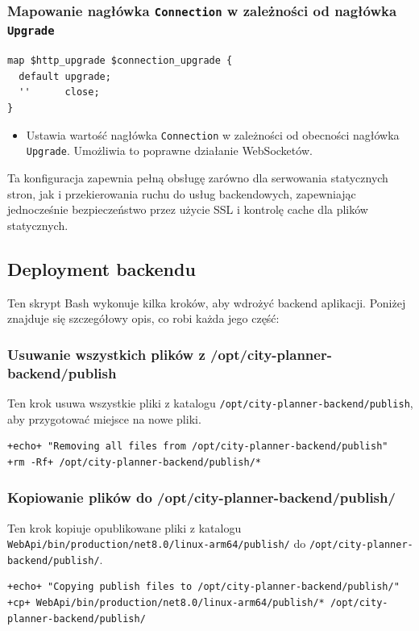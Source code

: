 \subsubsection{Mapowanie nagłówka \texttt{Connection} w zależności od nagłówka \texttt{Upgrade}}
\begin{lstlisting}[label={lst:n11}]
map $http_upgrade $connection_upgrade {
  default upgrade;
  ''      close;
}
\end{lstlisting}
\begin{itemize}
    \item Ustawia wartość nagłówka \texttt{Connection} w zależności od obecności nagłówka \texttt{Upgrade}.
    Umożliwia to poprawne działanie WebSocketów.
\end{itemize}

Ta konfiguracja zapewnia pełną obsługę zarówno dla serwowania statycznych stron, jak i przekierowania ruchu do usług backendowych, zapewniając jednocześnie bezpieczeństwo przez użycie SSL i kontrolę cache dla plików statycznych.

\subsection{Deployment backendu}
\label{subsec:deployment-backendu}
Ten skrypt Bash wykonuje kilka kroków, aby wdrożyć backend aplikacji.
Poniżej znajduje się szczegółowy opis, co robi każda jego część:

\subsubsection{Usuwanie wszystkich plików z /opt/city-planner-backend/publish}
Ten krok usuwa wszystkie pliki z katalogu \texttt{/opt/city-planner-backend/publish}, aby przygotować miejsce na nowe pliki.
\begin{lstlisting}[style=shell-colored,label={lst:db1}]
+echo+ "Removing all files from /opt/city-planner-backend/publish"
+rm -Rf+ /opt/city-planner-backend/publish/*
\end{lstlisting}

\subsubsection{Kopiowanie plików do /opt/city-planner-backend/publish/}
Ten krok kopiuje opublikowane pliki z katalogu \texttt{WebApi/bin/production/net8.0/linux-arm64/publish/} do \texttt{/opt/city-planner-backend/publish/}.
\begin{lstlisting}[style=shell-colored,label={lst:db2}]
+echo+ "Copying publish files to /opt/city-planner-backend/publish/"
+cp+ WebApi/bin/production/net8.0/linux-arm64/publish/* /opt/city-planner-backend/publish/
\end{lstlisting}

